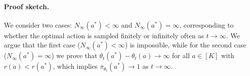 \paragraph{Proof sketch.} We consider two cases: $N_\infty(a^*) < \infty$ and $N_\infty(a^*) = \infty$, corresponding to whether the optimal action is sampled finitely or infinitely often as $t \to \infty$. We argue that the first case ($N_\infty(a^*) < \infty$) is impossible, while for the second case ($N_\infty(a^*) = \infty$) we prove that $\theta_t(a^*) - \theta_t(a) \to \infty$ for all $a \in [K]$ with $r(a) < r(a^*)$, which implies $\pi_{\theta_t}(a^*) \to 1$ as $t \to \infty$.


